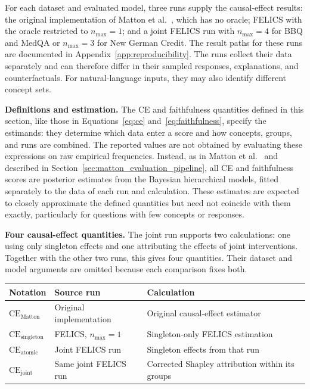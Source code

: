 For each dataset and evaluated model, three runs supply the causal-effect results: the original implementation of Matton et al.~\cite{mattonWalkTalkMeasuring2024}, which has no oracle; FELICS with the oracle restricted to $n_{\max}=1$; and a joint FELICS run with $n_{\max}=4$ for BBQ and MedQA or $n_{\max}=3$ for New German Credit. The result paths for these runs are documented in Appendix~\ref{app:reproducibility}. The runs collect their data separately and can therefore differ in their sampled responses, explanations, and counterfactuals. For natural-language inputs, they may also identify different concept sets.

\noindent\textbf{Definitions and estimation.} The CE and faithfulness quantities defined in this section, like those in Equations~\ref{eq:ce} and~\ref{eq:faithfulness}, specify the estimands: they determine which data enter a score and how concepts, groups, and runs are combined. The reported values are not obtained by evaluating these expressions on raw empirical frequencies. Instead, as in Matton et al.~\cite{mattonWalkTalkMeasuring2024} and described in Section~\ref{sec:matton_evaluation_pipeline}, all CE and faithfulness scores are posterior estimates from the Bayesian hierarchical models, fitted separately to the data of each run and calculation. These estimates are expected to closely approximate the defined quantities but need not coincide with them exactly, particularly for questions with few concepts or responses.

\noindent\textbf{Four causal-effect quantities.} The joint run supports two calculations: one using only singleton effects and one attributing the effects of joint interventions. Together with the other two runs, this gives four quantities. Their dataset and model arguments are omitted because each comparison fixes both.

\begin{center}
	\small
	\begin{tabular}{@{}p{}p{}p{}@{}}
		\hline
		\textbf{Notation}                  & \textbf{Source run}     & \textbf{Calculation}                            \\
		\hline
		$\mathrm{CE}_{\mathrm{Matton}}$    & Original implementation & Original causal-effect estimator                \\
		$\mathrm{CE}_{\mathrm{singleton}}$ & FELICS, $n_{\max}=1$    & Singleton-only FELICS estimation                \\
		$\mathrm{CE}_{\mathrm{atomic}}$    & Joint FELICS run        & Singleton effects from that run                 \\
		$\mathrm{CE}_{\mathrm{joint}}$     & Same joint FELICS run   & Corrected Shapley attribution within its groups \\
		\hline
	\end{tabular}
\end{center}

